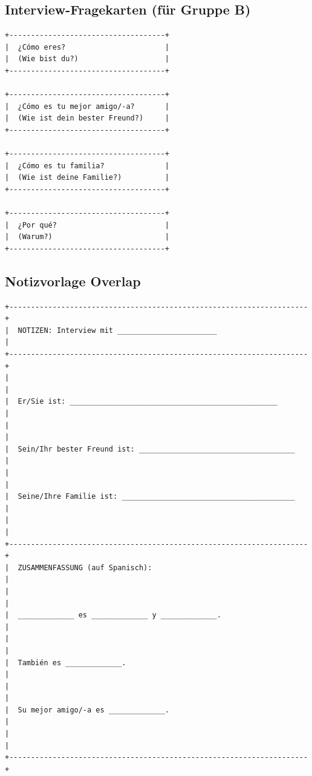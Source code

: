 \documentclass[11pt,a4paper]{article}
\begin{document}
\subsection{Interview-Fragekarten (für Gruppe B)}

\begin{verbatim}
+------------------------------------+
|  ¿Cómo eres?                       |
|  (Wie bist du?)                    |
+------------------------------------+

+------------------------------------+
|  ¿Cómo es tu mejor amigo/-a?       |
|  (Wie ist dein bester Freund?)     |
+------------------------------------+

+------------------------------------+
|  ¿Cómo es tu familia?              |
|  (Wie ist deine Familie?)          |
+------------------------------------+

+------------------------------------+
|  ¿Por qué?                         |
|  (Warum?)                          |
+------------------------------------+
\end{verbatim}

\subsection{Notizvorlage Overlap}

\begin{verbatim}
+---------------------------------------------------------------------+
|  NOTIZEN: Interview mit _______________________                      |
+---------------------------------------------------------------------+
|                                                                     |
|  Er/Sie ist: ________________________________________________       |
|                                                                     |
|  Sein/Ihr bester Freund ist: ____________________________________   |
|                                                                     |
|  Seine/Ihre Familie ist: ________________________________________   |
|                                                                     |
+---------------------------------------------------------------------+
|  ZUSAMMENFASSUNG (auf Spanisch):                                    |
|                                                                     |
|  _____________ es _____________ y _____________.                    |
|                                                                     |
|  También es _____________.                                          |
|                                                                     |
|  Su mejor amigo/-a es _____________.                                |
|                                                                     |
+---------------------------------------------------------------------+
\end{verbatim}
\end{document}
